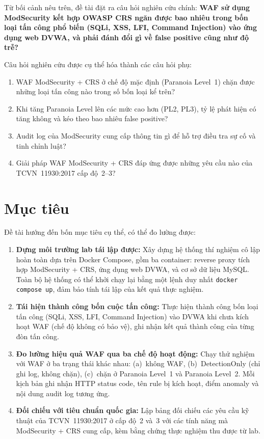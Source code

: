 \documentclass[12pt,a4paper,twoside]{report}
\begin{document}
Từ bối cảnh nêu trên, đề tài đặt ra câu hỏi nghiên cứu chính: \textbf{WAF sử dụng ModSecurity kết hợp OWASP CRS ngăn được bao nhiêu trong bốn loại tấn công phổ biến (SQLi, XSS, LFI, Command Injection) vào ứng dụng web DVWA, và phải đánh đổi gì về false positive cũng như độ trễ?}

Câu hỏi nghiên cứu được cụ thể hóa thành các câu hỏi phụ:
\begin{enumerate}
    \item WAF ModSecurity + CRS ở chế độ mặc định (Paranoia Level~1) chặn được những loại tấn công nào trong số bốn loại kể trên?
    \item Khi tăng Paranoia Level lên các mức cao hơn (PL2, PL3), tỷ lệ phát hiện có tăng không và kéo theo bao nhiêu false positive?
    \item Audit log của ModSecurity cung cấp thông tin gì để hỗ trợ điều tra sự cố và tinh chỉnh luật?
    \item Giải pháp WAF ModSecurity + CRS đáp ứng được những yêu cầu nào của TCVN~11930:2017 cấp độ~2--3?
\end{enumerate}

\section{Mục tiêu}

Đề tài hướng đến bốn mục tiêu cụ thể, có thể đo lường được:

\begin{enumerate}
    \item \textbf{Dựng môi trường lab tái lập được:} Xây dựng hệ thống thí nghiệm cô lập hoàn toàn dựa trên Docker Compose, gồm ba container: reverse proxy tích hợp ModSecurity + CRS, ứng dụng web DVWA, và cơ sở dữ liệu MySQL. Toàn bộ hệ thống có thể khởi chạy lại bằng một lệnh duy nhất \texttt{docker compose up}, đảm bảo tính tái lập của kết quả thực nghiệm.
    \item \textbf{Tái hiện thành công bốn cuộc tấn công:} Thực hiện thành công bốn loại tấn công (SQLi, XSS, LFI, Command Injection) vào DVWA khi chưa kích hoạt WAF (chế độ không có bảo vệ), ghi nhận kết quả thành công của từng đòn tấn công.
    \item \textbf{Đo lường hiệu quả WAF qua ba chế độ hoạt động:} Chạy thử nghiệm với WAF ở ba trạng thái khác nhau: (a)~không WAF, (b)~DetectionOnly (chỉ ghi log, không chặn), (c)~chặn ở Paranoia Level~1 và Paranoia Level~2. Mỗi kịch bản ghi nhận HTTP status code, tên rule bị kích hoạt, điểm anomaly và nội dung audit log tương ứng.
    \item \textbf{Đối chiếu với tiêu chuẩn quốc gia:} Lập bảng đối chiếu các yêu cầu kỹ thuật của TCVN~11930:2017 ở cấp độ~2 và~3 với các tính năng mà ModSecurity + CRS cung cấp, kèm bằng chứng thực nghiệm thu được từ lab.
\end{enumerate}
\end{document}
